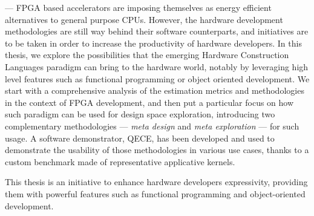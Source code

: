 {}
\renewcommand*{\hrulefill}[1][-0.2mm]{\leavevmode \leaders \hrule height #1 \hfill \kern 0pt}

\changepage{7em}{9em}{-7em}{-4em}{-10em}{-5em}{}{}{}



\vspace*{\fill}
{\normalsize
{} --- FPGA based accelerators are imposing themselves as energy efficient alternatives to general purpose CPUs.
However, the hardware development methodologies are still way behind their software counterparts, and initiatives are to be taken in order to increase the productivity of hardware developers.
In this thesis, we explore the possibilities that the emerging Hardware Construction Languages paradigm can bring to the hardware world, notably by leveraging high level features such as functional programming or object oriented development.
We start with a comprehensive analysis of the estimation metrics and methodologies in the context of FPGA development, and then put a particular focus on how such paradigm can be used for design space exploration, introducing two complementary methodologies --- {\it meta design} and {\it meta exploration} --- for such usage.
A software demonstrator, QECE, has been developed and used to demonstrate the usability of those methodologies in various use cases, thanks to a custom benchmark made  of representative applicative kernels.

This thesis is an initiative to enhance hardware developers expressivity, providing them with powerful features such as functional programming and object-oriented development.
}
\vspace*{\fill}%

~\\

